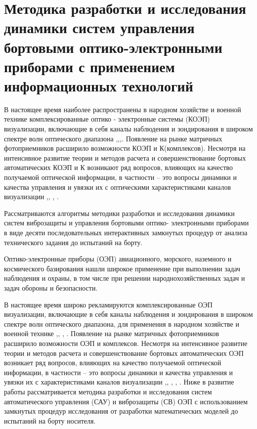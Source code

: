 \chapter{Методика разработки и исследования динамики систем управления бортовыми оптико-электронными приборами с применением информационных технологий} \label{ch:ch2}

В настоящее время наиболее распространены в народном хозяйстве и военной технике комплексированные оптико - электронные системы (КОЭП) визуализации, включающие в себя каналы наблюдения и зондирования в широком спектре волн оптического диапазона \cite[]{Tarasov},\cite[]{Belyakov},\cite[]{Karpov},\cite[]{Torshina}. Появление на рынке матричных фотоприемников расширило возможности КОЭП и К(комплексов). Несмотря на интенсивное развитие   теории и методов расчета и совершенствование бортовых автоматических КОЭП и К  возникают ряд вопросов, влияющих на качество получаемой оптической информации, в частности – это вопросы динамики и качества управления и увязки их с оптическими характеристиками каналов визуализации \cite[]{Belyakov},\cite[]{Karpov}, \cite[]{Baloev16}, \cite[]{Karpov17}.

Рассматриваются алгоритмы методики разработки и исследования динамики систем виброзащиты и управления бортовыми оптико- электронными приборами в виде десяти последовательных интерактивных замкнутых процедур от анализа технического задания до испытаний на борту.

Оптико-электронные приборы (ОЭП) авиационного, морского, наземного и космического базирования нашли широкое применение при выполнении задач наблюдения и охраны, в том числе при решении народнохозяйственных задач и задач обороны и безопасности.

В настоящее время широко рекламируются комплексированные ОЭП визуализации, включающие в себя каналы наблюдения и зондирования в широком спектре волн оптического диапазона, для применения в народном хозяйстве и военной технике \cite[]{Tarasov},\cite[]{Belyakov}, \cite[]{Torshina}, \cite[]{Ivanov18}. Появление на рынке матричных фотоприемников расширило возможности ОЭП и комплексов. Несмотря на интенсивное развитие   теории и методов расчета и совершенствование бортовых автоматических ОЭП возникает ряд вопросов, влияющих на качество получаемой оптической информации, в частности – это вопросы динамики и качества управления и увязки их с характеристиками каналов визуализации \cite[]{Tarasov},\cite[]{Belyakov}, \cite[]{Baloev16}, \cite[]{Karpov17}, \cite[]{Gerasin19}. Ниже в развитие работы \cite[]{Tarasov} рассматривается методика разработки и исследования систем автоматического управления (САУ) и виброзащиты (СВ) ОЭП с использованием замкнутых процедур исследования от разработки математических моделей до испытаний на борту носителя.


